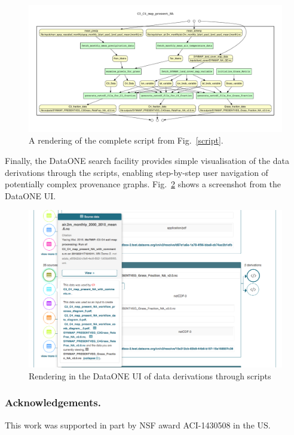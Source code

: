 \documentclass[a4paper]{llncs}
\begin{document}
\begin{figure}
\centering 
\includegraphics[width=\textwidth]{C3_C4_map_present_NA_workflow_comb_diagram} 
\caption{A rendering of the complete script from Fig.~\ref{script}.} 
 \label{yw-graph} 
 \end{figure}

Finally, the DataONE search facility provides simple visualisation of the data derivations through the scripts, enabling step-by-step user navigation of potentially complex provenance graphs. Fig.~\ref{UI} shows a screenshot from the DataONE UI.

\begin{figure}
\centering 
\includegraphics[width=\textwidth]{UI-screenshot-derivations} 
\caption{Rendering in the DataONE UI of data derivations through scripts}
 \label{UI} 
 \end{figure}

\subsubsection*{Acknowledgements.}

This work was supported in part by NSF award ACI-1430508 in the US.



\end{document}

